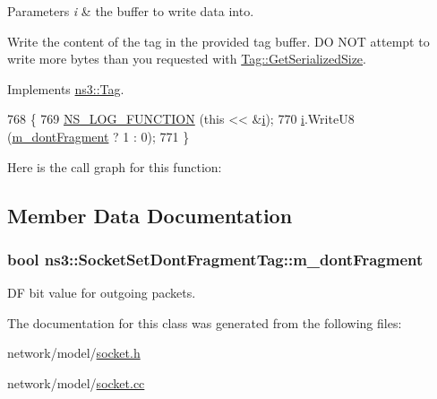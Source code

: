\begin{DoxyParams}{Parameters}
{\em i} & the buffer to write data into.\\
\hline
\end{DoxyParams}
Write the content of the tag in the provided tag buffer. DO N\+OT attempt to write more bytes than you requested with \hyperlink{classns3_1_1Tag_a01c8efdea943fd8cce2ef5d4d67eefa6}{Tag\+::\+Get\+Serialized\+Size}. 

Implements \hyperlink{classns3_1_1Tag_ac9aa7c4f923da5d2c82de94690101dc3}{ns3\+::\+Tag}.


\begin{DoxyCode}
768 \{
769   \hyperlink{log-macros-disabled_8h_a90b90d5bad1f39cb1b64923ea94c0761}{NS\_LOG\_FUNCTION} (\textcolor{keyword}{this} << &\hyperlink{bernuolliDistribution_8m_a6f6ccfcf58b31cb6412107d9d5281426}{i});
770   \hyperlink{bernuolliDistribution_8m_a6f6ccfcf58b31cb6412107d9d5281426}{i}.WriteU8 (\hyperlink{classns3_1_1SocketSetDontFragmentTag_ab1786d89e2063b36a9daa02478dfca34}{m\_dontFragment} ? 1 : 0);
771 \}
\end{DoxyCode}


Here is the call graph for this function\+:




\subsection{Member Data Documentation}
\subsubsection[{\texorpdfstring{m\+\_\+dont\+Fragment}{m_dontFragment}}]{\setlength{\rightskip}{0pt plus 5cm}bool ns3\+::\+Socket\+Set\+Dont\+Fragment\+Tag\+::m\+\_\+dont\+Fragment\hspace{0.3cm}{\ttfamily [private]}}\hypertarget{classns3_1_1SocketSetDontFragmentTag_ab1786d89e2063b36a9daa02478dfca34}{}\label{classns3_1_1SocketSetDontFragmentTag_ab1786d89e2063b36a9daa02478dfca34}


DF bit value for outgoing packets. 



The documentation for this class was generated from the following files\+:\begin{DoxyCompactItemize}
\item 
network/model/\hyperlink{socket_8h}{socket.\+h}\item 
network/model/\hyperlink{socket_8cc}{socket.\+cc}\end{DoxyCompactItemize}
